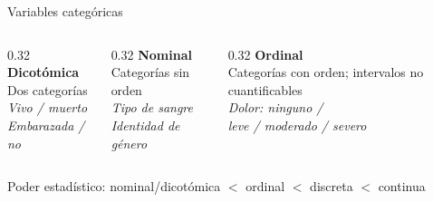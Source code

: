 \documentclass[aspectratio=169, 12pt, xcolor=table]{beamer}
\begin{document}
\begin{frame}{Variables categóricas}
  \begin{columns}[T]
    \begin{column}{0.32\textwidth}
      \textbf{\textcolor{accent}{Dicotómica}}\\[4pt]
      Dos categorías\\[4pt]
      \textit{Vivo / muerto}\\
      \textit{Embarazada / no}
    \end{column}
    \begin{column}{0.32\textwidth}
      \textbf{\textcolor{accent}{Nominal}}\\[4pt]
      Categorías sin orden\\[4pt]
      \textit{Tipo de sangre}\\
      \textit{Identidad de género}
    \end{column}
    \begin{column}{0.32\textwidth}
      \textbf{\textcolor{accent}{Ordinal}}\\[4pt]
      Categorías con orden; intervalos no cuantificables\\[4pt]
      \textit{Dolor: ninguno /}\\
      \textit{leve / moderado / severo}
    \end{column}
  \end{columns}

  \vspace{8pt}
  \begin{nota}
    Poder estadístico: nominal/dicotómica $<$ ordinal $<$ discreta $<$ continua
  \end{nota}
\end{frame}
\end{document}
